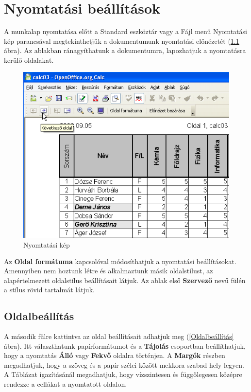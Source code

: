 \chapter{Nyomtatási beállítások}
\thispagestyle{empty}

A munkalap nyomtatása előtt a Standard eszköztár vagy a Fájl
menü Nyomtatási kép parancsával megtekinthetjük a
dokumentumunk nyomtatási előnézetét (\ref{NyomtatásiKép} ábra). Az
ablakban ránagyíthatunk a dokumentumra, lapozhatjuk a nyomtatásra
kerülő oldalakat.

\begin{figure}[!h]
\begin{center}
\includegraphics[width=12.52cm]{oocalcv2-img164.png}
\caption{Nyomtatási kép}\label{NyomtatásiKép}
\end{center}
\end{figure}

Az \textbf{Oldal formátuma} kapcsolóval módosíthatjuk a
nyomtatási beállításokat. Amennyiben nem hoztunk létre és
alkalmaztunk másik oldalstílust, az alapértelmezett oldalstílus
beállításait látjuk. Az ablak első \textbf{Szervező} nevű fülén a stílus
rövid tartalmát látjuk. 


\section{Oldalbeállítás}

A második fülre kattintva az oldal beállításait adhatjuk meg
(\ref{Oldalbeállítás} ábra). Itt választhatunk papírformátumot és a
\textbf{Tájolás} csoportban beállíthatjuk, hogy a nyomtatás
\textbf{Álló} vagy \textbf{Fekvő} oldalra történjen. A
\textbf{Margók} részben megadhatjuk, hogy a szöveg és a papír
szélei között mekkora szabad hely legyen. A Táblázat
igazításánál megadhatjuk, hogy vízszintesen és
függőlegesen középre rendezze a cellákat a nyomtatott
oldalon.

